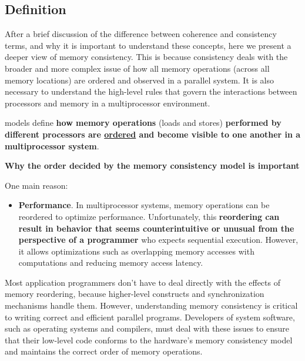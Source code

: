 \subsection{Definition}

After a brief discussion of the difference between coherence and consistency terms, and why it is important to understand these concepts, here we present a deeper view of memory consistency. This is because consistency deals with the broader and more complex issue of how all memory operations (across all memory locations) are ordered and observed in a parallel system. It is also necessary to understand the high-level rules that govern the interactions between processors and memory in a multiprocessor environment.

\begin{definitionbox}
     models define \textbf{how memory operations} (loads and stores) \textbf{performed by different processors are \underline{ordered} and become visible to one another in a multiprocessor system}.
\end{definitionbox}

\highspace
\begin{flushleft}
    \textcolor{Green3}{ \textbf{Why the order decided by the memory consistency model is important}}
\end{flushleft}
One main reason:
\begin{itemize}
    \item \textbf{Performance}. In multiprocessor systems, memory operations can be reordered to optimize performance. Unfortunately, this \textbf{reordering can result in behavior that seems counterintuitive or unusual from the perspective of a programmer} who expects sequential execution. However, it allows optimizations such as overlapping memory accesses with computations and reducing memory access latency.
\end{itemize}
Most application programmers don't have to deal directly with the effects of memory reordering, because higher-level constructs and synchronization mechanisms handle them. However, understanding memory consistency is critical to writing correct and efficient parallel programs. Developers of system software, such as operating systems and compilers, must deal with these issues to ensure that their low-level code conforms to the hardware's memory consistency model and maintains the correct order of memory operations.

\newpage

